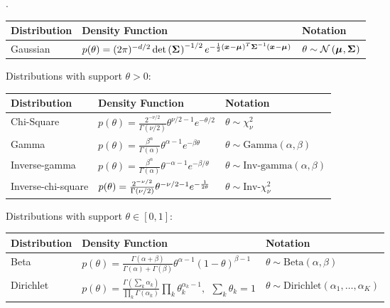 \documentclass[11pt]{article}
\begin{document}

\p {}.

\begin{tabular}{l | l | l}
	Distribution & Density Function & Notation \\ \hline \hline 
	Gaussian
	& $p(\theta) = (2\pi)^{-d/2} \det \left(  \bm{\Sigma}_{}   \right)^{-1/2} e^{  -\frac{1}{2} (\bm{x}_{} - \bm{\mu}_{})^T \bm{\Sigma}_{}^{-1} (\bm{x}_{}- \bm{\mu}_{})   }$ 
	& $\theta \sim \mathcal{N}\left( \bm{\mu}_{} , \bm{\Sigma}_{} \right)$ \\ \hline
\end{tabular}

Distributions with support $\theta > 0$:

\begin{tabular}{l | l | l}
	Distribution & Density Function & Notation \\ \hline \hline 
	Chi-Square 
		& $p(\theta) = \frac{2^{-\nu/2}}{\Gamma(\nu/2)} \theta^{\nu/2 - 1} e^{-\theta/2}$ 
		& $\theta \sim \chi_{\nu}^2$ \\ \hline 
	Gamma 
		&	$p(\theta) = \frac{\beta^{\alpha}}{\Gamma(\alpha)} \theta^{\alpha - 1} e^{-\beta\theta}$
		& $\theta \sim \text{Gamma}(\alpha, \beta)$ \\ \hline
	Inverse-gamma 
		& $p(\theta) = \frac{\beta^{\alpha}}{\Gamma(\alpha)} \theta^{- \alpha - 1} e^{-\beta / \theta}$
		& $\theta \sim \text{Inv-gamma}(\alpha, \beta)$ \\ \hline 
	Inverse-chi-square 
		& $p(\theta) = \frac{2^{-\nu/2}}{\Gamma(\nu/2)} \theta^{- \nu/2 - 1} e^{-\frac{1}{2\theta}}$ 
		& $\theta \sim \text{Inv-} \chi_{\nu}^2$ \\ \hline 
\end{tabular}

Distributions with support $\theta \in [0, 1]$:

\begin{tabular}{l | l | l}
	Distribution & Density Function & Notation \\ \hline \hline 
	Beta 
		& $p(\theta) =  \frac{\Gamma(\alpha + \beta)}{\Gamma(\alpha) + \Gamma(\beta)}  \theta^{\alpha - 1}(1 - \theta)^{\beta - 1} $ 
		& $\theta \sim \text{Beta}(\alpha, \beta)$ \\ \hline
	Dirichlet 
		& $p(\theta) =  \frac{\Gamma(\sum_k \alpha_k)}{\prod_k \Gamma(\alpha_k)} \prod_k \theta_k^{\alpha_k - 1}, ~~ \sum_k \theta_k = 1$ 
		& $\theta \sim \text{Dirichlet}(\alpha_1, \ldots, \alpha_K)$ \\ \hline 
\end{tabular}
\end{document}
